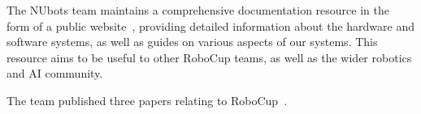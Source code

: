 \documentclass{llncs}
\begin{document}
The NUbots team maintains a comprehensive documentation resource in the form of a public website~\cite{nubotsNUbookGit}, providing detailed information about the hardware and software systems, as well as guides on various aspects of our systems. This resource aims to be useful to other RoboCup teams, as well as the wider robotics and AI community.

The team published three papers relating to RoboCup~\cite{Biddulph2023,obrien2023,director2023}.




\end{document}
